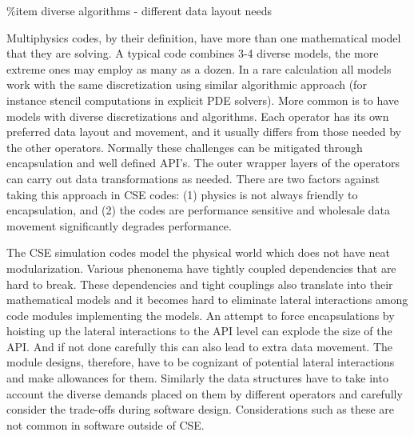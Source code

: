 \%item diverse algorithms - different data layout needs

Multiphysics codes, by their definition, have more than one
mathematical model that they are solving. A typical code combines 3-4
diverse models, the more extreme ones may employ as many as a
dozen. In a rare calculation all models work with the same
discretization using similar algorithmic approach (for instance
stencil computations in explicit PDE solvers). More common is to have
models with diverse discretizations and algorithms. Each operator has
its own preferred data layout and  movement, and it usually differs
from those needed by the other operators.  Normally these challenges
can be mitigated through encapsulation and well defined API's. The outer
wrapper layers of the operators can carry out data transformations as
needed. There are two factors against taking this approach in CSE
codes: (1) physics is not always friendly to encapsulation, and (2)
the codes are performance sensitive and wholesale data movement
significantly degrades performance. 

The CSE simulation codes model the physical world which does not
have neat modularization. Various phenonema have tightly coupled
dependencies that are hard to break. These dependencies and tight
couplings also translate into their mathematical models and it becomes
hard to eliminate lateral interactions among code modules implementing
the models. An attempt to force encapsulations by hoisting up the
lateral interactions to the API level can explode the size of the
API. And if not done carefully this can also lead to extra data
movement. The module designs, therefore, have to be cognizant of
potential lateral interactions and make allowances for them.
Similarly the data structures have to take into account the diverse
demands placed on them by different operators and carefully consider
the trade-offs during software design. Considerations such as these
are not common in software outside of CSE.  


